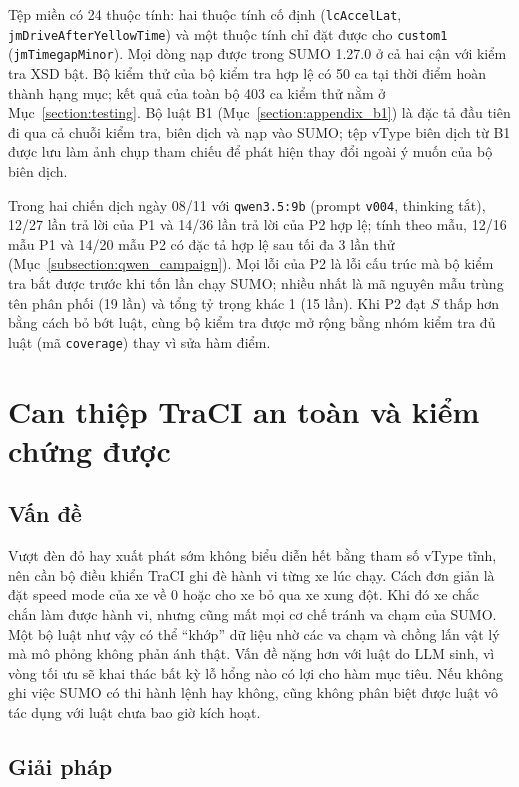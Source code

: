 \documentclass[../main.tex]{subfiles}
\begin{document}
Tệp miền có 24 thuộc tính: hai thuộc tính cố định (\texttt{lcAccelLat}, \texttt{jmDriveAfterYellowTime}) và một thuộc tính chỉ đặt được cho \texttt{custom1} (\texttt{jmTimegapMinor}). Mọi dòng nạp được trong SUMO 1.27.0 ở cả hai cận với kiểm tra XSD bật. Bộ kiểm thử của bộ kiểm tra hợp lệ có 50 ca tại thời điểm hoàn thành hạng mục; kết quả của toàn bộ 403 ca kiểm thử nằm ở Mục~\ref{section:testing}. Bộ luật B1 (Mục~\ref{section:appendix_b1}) là đặc tả đầu tiên đi qua cả chuỗi kiểm tra, biên dịch và nạp vào SUMO; tệp vType biên dịch từ B1 được lưu làm ảnh chụp tham chiếu để phát hiện thay đổi ngoài ý muốn của bộ biên dịch.

Trong hai chiến dịch ngày 08/11 với \texttt{qwen3.5:9b} (prompt \texttt{v004}, thinking tắt), 12/27 lần trả lời của P1 và 14/36 lần trả lời của P2 hợp lệ; tính theo mẫu, 12/16 mẫu P1 và 14/20 mẫu P2 có đặc tả hợp lệ sau tối đa 3 lần thử (Mục~\ref{subsection:qwen_campaign}). Mọi lỗi của P2 là lỗi cấu trúc mà bộ kiểm tra bắt được trước khi tốn lần chạy SUMO; nhiều nhất là mã nguyên mẫu trùng tên phân phối (19 lần) và tổng tỷ trọng khác 1 (15 lần). Khi P2 đạt $S$ thấp hơn bằng cách bỏ bớt luật, cùng bộ kiểm tra được mở rộng bằng nhóm kiểm tra đủ luật (mã \texttt{coverage}) thay vì sửa hàm điểm.

\section{Can thiệp TraCI an toàn và kiểm chứng được}
\label{section:5.2}

\subsection{Vấn đề}

Vượt đèn đỏ hay xuất phát sớm không biểu diễn hết bằng tham số vType tĩnh, nên cần bộ điều khiển TraCI ghi đè hành vi từng xe lúc chạy. Cách đơn giản là đặt speed mode của xe về 0 hoặc cho xe bỏ qua xe xung đột. Khi đó xe chắc chắn làm được hành vi, nhưng cũng mất mọi cơ chế tránh va chạm của SUMO. Một bộ luật như vậy có thể ``khớp'' dữ liệu nhờ các va chạm và chồng lấn vật lý mà mô phỏng không phản ánh thật. Vấn đề nặng hơn với luật do LLM sinh, vì vòng tối ưu sẽ khai thác bất kỳ lỗ hổng nào có lợi cho hàm mục tiêu. Nếu không ghi việc SUMO có thi hành lệnh hay không, cũng không phân biệt được luật vô tác dụng với luật chưa bao giờ kích hoạt.

\subsection{Giải pháp}
\end{document}
